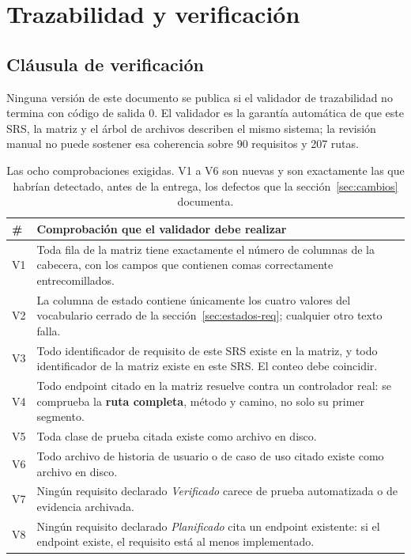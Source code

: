 \documentclass[11pt,a4paper]{article}
\begin{document}
\section{Trazabilidad y verificación}
\label{sec:trazabilidad}

\subsection{Cláusula de verificación}

Ninguna versión de este documento se publica si el validador de trazabilidad no termina con
código de salida 0. El validador es la garantía automática de que este SRS, la matriz y el árbol
de archivos describen el mismo sistema; la revisión manual no puede sostener esa coherencia
sobre 90 requisitos y 207 rutas.

\begin{table}[H]\centering\small
\begin{tabular}{p{0.8cm} p{13.9cm}}
\toprule
\textbf{\#} & \textbf{Comprobación que el validador debe realizar} \\
\midrule
V1 & Toda fila de la matriz tiene exactamente el número de columnas de la cabecera, con los
campos que contienen comas correctamente entrecomillados. \\
V2 & La columna de estado contiene únicamente los cuatro valores del vocabulario cerrado de la
sección~\ref{sec:estados-req}; cualquier otro texto falla. \\
V3 & Todo identificador de requisito de este SRS existe en la matriz, y todo identificador de la
matriz existe en este SRS. El conteo debe coincidir. \\
V4 & Todo endpoint citado en la matriz resuelve contra un controlador real: se comprueba la
\textbf{ruta completa}, método y camino, no solo su primer segmento. \\
V5 & Toda clase de prueba citada existe como archivo en disco. \\
V6 & Todo archivo de historia de usuario o de caso de uso citado existe como archivo en disco. \\
V7 & Ningún requisito declarado \emph{Verificado} carece de prueba automatizada o de evidencia
archivada. \\
V8 & Ningún requisito declarado \emph{Planificado} cita un endpoint existente: si el endpoint
existe, el requisito está al menos implementado. \\
\bottomrule
\end{tabular}
\caption{Las ocho comprobaciones exigidas. V1 a V6 son nuevas y son
exactamente las que habrían detectado, antes de la entrega, los defectos que la
sección~\ref{sec:cambios} documenta.}
\end{table}
\end{document}
